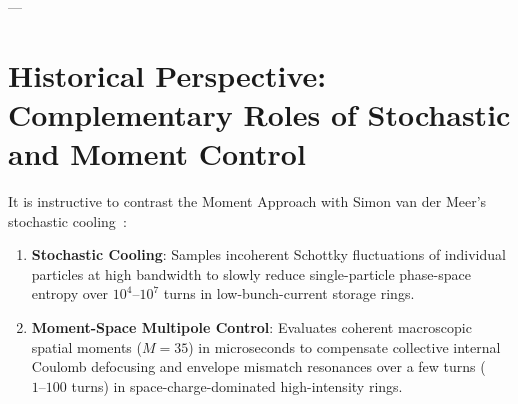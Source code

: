 \documentclass[11pt,a4paper]{article}
\begin{document}
\begin{table}[htbp]
\centering
\caption{Comparison of 3D Space-Charge Solvers for High-Intensity Ring Active Control}
\label{tab:accelerator_benchmark}
\end{table}

---

\section{Historical Perspective: Complementary Roles of Stochastic and Moment Control}
It is instructive to contrast the Moment Approach with Simon van der Meer's stochastic cooling~\cite{vandermeer1972stochastic,vandermeer1985nobel}:
\begin{enumerate}
    \item \textbf{Stochastic Cooling}: Samples incoherent Schottky fluctuations of individual particles at high bandwidth to slowly reduce single-particle phase-space entropy over $10^4\text{--}10^7$ turns in low-bunch-current storage rings.
    \item \textbf{Moment-Space Multipole Control}: Evaluates coherent macroscopic spatial moments ($M=35$) in microseconds to compensate collective internal Coulomb defocusing and envelope mismatch resonances over a few turns ($1\text{--}100$ turns) in space-charge-dominated high-intensity rings.
\end{enumerate}
\end{document}
